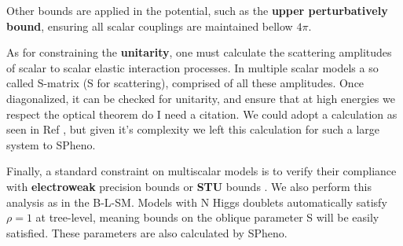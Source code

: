 Other bounds are applied in the potential, such as the \textbf{upper perturbatively bound}, ensuring all scalar couplings are maintained bellow $4\pi$. 

As for constraining the \textbf{unitarity}, one must calculate the scattering amplitudes of scalar to scalar elastic interaction processes.
%
In multiple scalar models a so called S-matrix (S for scattering), comprised of all these amplitudes. Once diagonalized, it can be checked for unitarity, and ensure that at high energies we respect the optical theorem {\color{red} do I need a citation}. 
%
We could adopt a calculation as seen in Ref \cite{Moretti_2015}, but given it's complexity we left this calculation for such a large system to SPheno.

Finally, a standard constraint on multiscalar models is to verify their compliance with \textbf{electroweak} precision bounds or \textbf{STU} bounds \cite{Peskin1992}. We also perform this analysis as in the B-L-SM. 
% 
Models with N Higgs doublets automatically satisfy $\rho = 1$ at tree-level, meaning bounds on the oblique parameter S will be easily satisfied. These parameters are also calculated by SPheno. 


